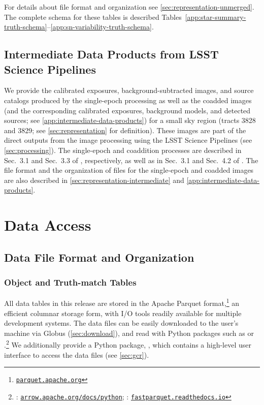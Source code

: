\documentclass[modern]{descnote}
\newcommand*{\https}[1]{\href{https://#1}{\nolinkurl{#1}}}
\begin{document}
For details about file format and organization see \autoref{sec:representation-unmerged}. The complete schema for these tables is described Tables~\ref{app:star-summary-truth-schema}--\ref{app:sn-variability-truth-schema}.

\subsection{Intermediate Data Products from LSST Science Pipelines}
\label{sec:intermediate-data-products}

We provide the calibrated exposures, background-subtracted images, and source catalogs produced by the single-epoch processing as well as the coadded images (and the corresponding calibrated exposures, background models, and detected sources; see \autoref{app:intermediate-data-products}) for a small sky region (tracts 3828 and 3829; see \autoref{sec:representation} for definition). These images are part of the direct outputs from the image processing using the LSST Science Pipelines (see \autoref{sec:processing}). The single-epoch and coaddition processes are described in Sec.~3.1 and Sec.~3.3 of \cite{10.1093/pasj/psx080}, respectively, as well as in Sec.~3.1 and Sec.~4.2 of \cite{2018arXiv181203248B}. 
The file format and the organization of files for the single-epoch and coadded images are also described in \autoref{sec:representation-intermediate} and \autoref{app:intermediate-data-products}. 



\section{Data Access}
\label{sec:access}


\subsection{Data File Format and Organization}
\label{sec:representation}

\subsubsection{Object and Truth-match Tables}
\label{sec:representation-tables}

All data tables in this release are stored in the Apache Parquet format,\footnote{\https{parquet.apache.org}} an efficient columnar storage form, with I/O tools readily available for multiple development systems. 
The data files can be easily downloaded to the user's machine via Globus (\autoref{sec:download}), and read with Python packages such as  or .\footnote{: \https{arrow.apache.org/docs/python}; : \https{fastparquet.readthedocs.io}}
We additionally provide a Python package, , which contains a high-level user interface to access the data files (see \autoref{sec:gcr}). 
\end{document}
